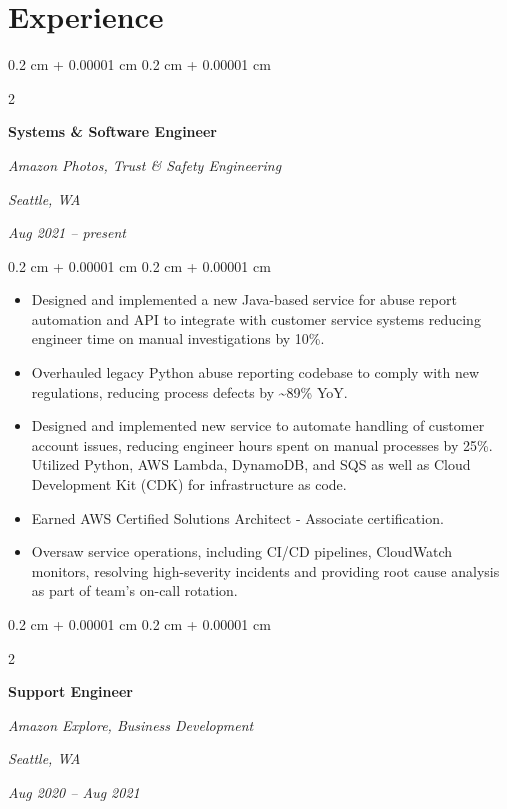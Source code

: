 \documentclass[10pt, letterpaper]{article}
\newenvironment{highlights}{
    \begin{itemize}[
        topsep=0.10 cm,
        parsep=0.10 cm,
        partopsep=0pt,
        itemsep=0pt,
        leftmargin=0.4 cm + 10pt
    ]
}{
    \end{itemize}
} %
\newenvironment{onecolentry}{
    \begin{adjustwidth}{
        0.2 cm + 0.00001 cm
    }{
        0.2 cm + 0.00001 cm
    }
}{
    \end{adjustwidth}
} %
\newenvironment{twocolentry}[2][]{
    \onecolentry
    \def\secondColumn{#2}
    \setcolumnwidth{\fill, 4.5 cm}
    \begin{paracol}{2}
}{
    \switchcolumn \raggedleft \secondColumn
    \end{paracol}
    \endonecolentry
} %
\begin{document}
    
    \section{Experience}



        
        \begin{twocolentry}{
        \textit{Seattle, WA}    
            
        \textit{Aug 2021 – present}}
            \textbf{Systems \& Software Engineer}
            
            \textit{Amazon Photos, Trust \& Safety Engineering}
        \end{twocolentry}

        \vspace{0.10 cm}
        \begin{onecolentry}
            \begin{highlights}
                \item Designed and implemented a new Java-based service for abuse report automation and API to integrate with customer service systems reducing engineer time on manual investigations by 10\%.
                \item Overhauled legacy Python abuse reporting codebase to comply with new regulations, reducing process defects by \textasciitilde{}89\% YoY.
                \item Designed and implemented new service to automate handling of customer account issues, reducing engineer hours spent on manual processes by 25\%. Utilized Python, AWS Lambda, DynamoDB, and SQS as well as Cloud Development Kit (CDK) for infrastructure as code.
                \item Earned AWS Certified Solutions Architect - Associate certification.
                \item Oversaw service operations, including CI/CD pipelines, CloudWatch monitors, resolving high-severity incidents and providing root cause analysis as part of team’s on-call rotation.
            \end{highlights}
        \end{onecolentry}


        \vspace{0.2 cm}

        \begin{twocolentry}{
        \textit{Seattle, WA}    
            
        \textit{Aug 2020 – Aug 2021}}
            \textbf{Support Engineer}
            
            \textit{Amazon Explore, Business Development}
        \end{twocolentry}
\end{document}
